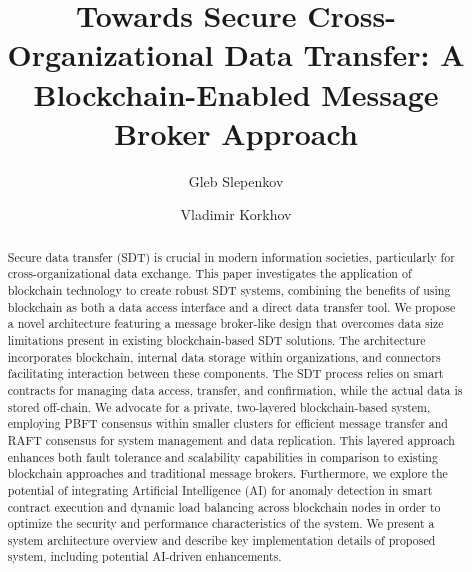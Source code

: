 \documentclass[10pt]{llncs}
\begin{document}
\title{Towards Secure Cross-Organizational Data Transfer: A Blockchain-Enabled Message Broker Approach}
\author{Gleb Slepenkov\and Vladimir Korkhov}

\maketitle

\begin{abstract}
    Secure data transfer (SDT) is crucial in modern information societies, particularly for cross-organizational data exchange. 
    This paper investigates the application of blockchain technology to create robust SDT systems, combining the benefits of using blockchain as both a data access interface and a direct data transfer tool. 
    We propose a novel architecture featuring a message broker-like design that overcomes data size limitations present in existing blockchain-based SDT solutions. 
    The architecture incorporates blockchain, internal data storage within organizations, and connectors facilitating interaction between these components. 
    The SDT process relies on smart contracts for managing data access, transfer, and confirmation, while the actual data is stored off-chain. 
    We advocate for a private, two-layered blockchain-based system, employing PBFT consensus within smaller clusters for efficient message transfer and RAFT consensus for system management and data replication. 
    This layered approach enhances both fault tolerance and scalability capabilities in comparison to existing blockchain approaches and traditional message brokers.
    Furthermore, we explore the potential of integrating Artificial Intelligence (AI) for anomaly detection in smart contract execution and dynamic load balancing across blockchain nodes in order to optimize 
    the security and performance characteristics of the system.
    We present a system architecture overview and describe key implementation details of proposed system, including potential AI-driven enhancements.
    
\end{abstract}
\end{document}
